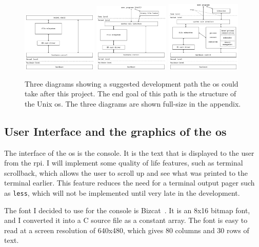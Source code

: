 \documentclass{article}
\begin{document}
\begin{figure}[htbp]
    \centering
    \includegraphics[width=0.32\textwidth]{build/finished-block-diagram.pdf}
    \includegraphics[width=0.32\textwidth]{build/nextstep-block-diagram.pdf}
    \includegraphics[width=0.32\textwidth]{build/os-block-diagram.pdf}
    \caption{Three diagrams showing a suggested development path the \gls{os}
    could take after this project. The end goal of this path is the structure
    of the Unix \gls{os}. The three diagrams are shown full-size in the
    appendix.}
    \label{fig:block_diagrams_progression}
\end{figure}

\subsection{User Interface and the graphics of the
\texorpdfstring{\gls{os}}{OS}}
The interface of the \gls{os} is the console. It is the text that is displayed
to the user from the \gls{rpi}. I will implement some quality of life features,
such as terminal scrollback, which allows the user to scroll up and see what
was printed to the terminal earlier. This feature reduces the need for a
terminal output pager such as \texttt{less}, which will not be implemented
until very late in the development.

The font I decided to use for the console is Bizcat~\cite{bizcat-font}. It is
an 8x16 bitmap font, and I converted it into a C source file as a constant
array. The font is easy to read at a screen resolution of 640x480, which gives
80 columns and 30 rows of text.
\end{document}

